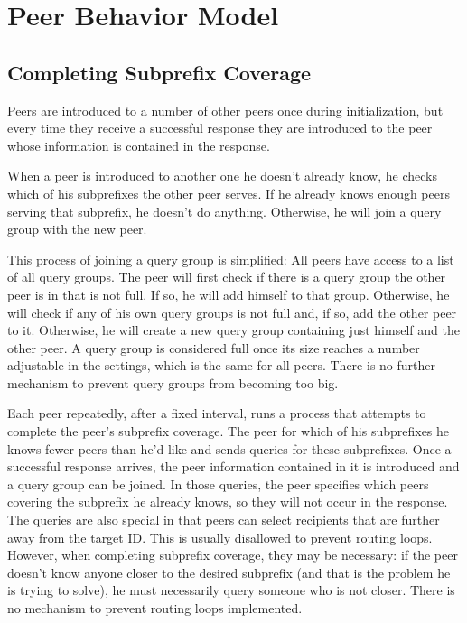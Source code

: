 \section{Peer Behavior Model}
\subsection{Completing Subprefix Coverage}
Peers are introduced to a number of other peers once during initialization, but
every time they receive a successful response they are introduced to the peer
whose information is contained in the response.

When a peer is introduced to another one he doesn't already know, he checks
which of his subprefixes the other peer serves. If he already knows enough peers
serving that subprefix, he doesn't do anything. Otherwise, he will join a query
group with the new peer.

This process of joining a query group is simplified: All peers have access to a
list of all query groups. The peer will first check if there is a query group
the other peer is in that is not full. If so, he will add himself to that group.
Otherwise, he will check if any of his own query groups is not full and, if so,
add the other peer to it. Otherwise, he will create a new query group containing
just himself and the other peer. A query group is considered full once its size
reaches a number adjustable in the settings, which is the same for all peers.
There is no further mechanism to prevent query groups from becoming too big.

Each peer repeatedly, after a fixed interval, runs a process that attempts to
complete the peer's subprefix coverage. The peer for which of his subprefixes he
knows fewer peers than he'd like and sends queries for these subprefixes. Once a
successful response arrives, the peer information contained in it is introduced
and a query group can be joined. In those queries, the peer specifies which
peers covering the subprefix he already knows, so they will not occur in the
response. The queries are also special in that peers can select recipients that
are further away from the target ID. This is usually disallowed to prevent
routing loops. However, when completing subprefix coverage, they may be
necessary: if the peer doesn't know anyone closer to the desired subprefix (and
that is the problem he is trying to solve), he must necessarily query someone
who is not closer. There is no mechanism to prevent routing loops implemented.

